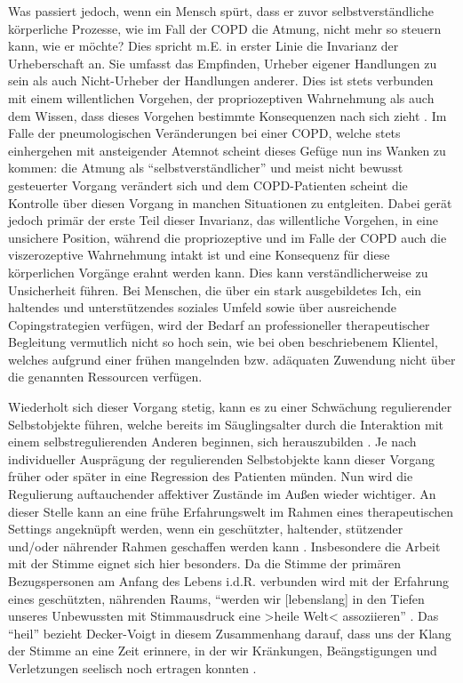 Was passiert jedoch, wenn ein Mensch spürt, dass er zuvor selbstverständliche körperliche Prozesse, wie im Fall der COPD die Atmung, nicht mehr so steuern kann, wie er möchte? Dies spricht m.E. in erster Linie die Invarianz der Urheberschaft an. Sie umfasst das Empfinden, Urheber eigener Handlungen zu sein als auch Nicht-Urheber der Handlungen anderer. Dies ist stets verbunden mit einem willentlichen Vorgehen, der propriozeptiven Wahrnehmung als auch dem Wissen, dass dieses Vorgehen bestimmte Konsequenzen nach sich zieht \autocite[vgl.][106, 114f.]{stern2007}. Im Falle der pneumologischen Veränderungen bei einer COPD, welche stets einhergehen mit ansteigender Atemnot scheint dieses Gefüge nun ins Wanken zu kommen: die Atmung als "`selbstverständlicher"' und meist nicht bewusst gesteuerter Vorgang verändert sich und dem COPD-Patienten scheint die Kontrolle über diesen Vorgang in manchen Situationen zu entgleiten. Dabei gerät jedoch primär der erste Teil dieser Invarianz, das willentliche Vorgehen, in eine unsichere Position, während die propriozeptive und im Falle der COPD auch die viszerozeptive Wahrnehmung intakt ist und eine Konsequenz für diese körperlichen Vorgänge erahnt werden kann. Dies kann verständlicherweise zu Unsicherheit führen. Bei Menschen, die über ein stark ausgebildetes Ich, ein haltendes und unterstützendes soziales Umfeld sowie über ausreichende Copingstrategien verfügen, wird der Bedarf an professioneller therapeutischer Begleitung vermutlich nicht so hoch sein, wie bei oben beschriebenem Klientel, welches aufgrund einer frühen mangelnden bzw. adäquaten Zuwendung nicht über die genannten Ressourcen verfügen. 

Wiederholt sich dieser Vorgang stetig, kann es zu einer Schwächung regulierender Selbstobjekte führen, welche bereits im Säuglingsalter durch die Interaktion mit einem selbstregulierenden Anderen beginnen, sich herauszubilden \autocite[vgl.][338f.]{stern2007}. Je nach individueller Ausprägung der regulierenden Selbstobjekte kann dieser Vorgang früher oder später in eine Regression des Patienten münden. Nun wird die Regulierung auftauchender affektiver Zustände im Außen wieder wichtiger. 
An dieser Stelle kann an eine frühe Erfahrungswelt im Rahmen eines therapeutischen Settings angeknüpft werden, wenn ein geschützter, haltender, stützender und/oder nährender Rahmen geschaffen werden kann \autocite[vgl.][58ff.]{timmermann2008}. Insbesondere die Arbeit mit der Stimme eignet sich hier besonders. Da die Stimme der primären Bezugspersonen am Anfang des Lebens i.d.R. verbunden wird mit der Erfahrung eines geschützten, nährenden Raums, "`werden wir [lebenslang] in den Tiefen unseres Unbewussten mit Stimmausdruck eine >heile Welt< assoziieren"' \autocite[282]{deckervoigt2000}. Das "`heil"' bezieht Decker-Voigt in diesem Zusammenhang darauf, dass uns der Klang der Stimme an eine Zeit erinnere, in der wir Kränkungen, Beängstigungen und Verletzungen seelisch noch ertragen konnten \autocite[vgl.][282]{deckervoigt2000}. 

